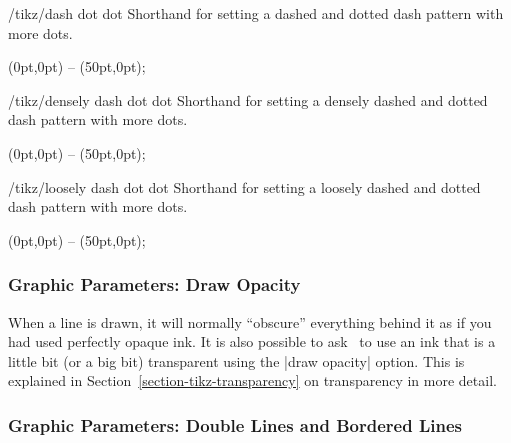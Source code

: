 \begin{stylekey}{/tikz/dash dot dot}
    Shorthand for setting a dashed and dotted dash pattern with more dots.
\begin{codeexample}[]
\tikz {} (0pt,0pt) -- (50pt,0pt);
\end{codeexample}
\end{stylekey}

\begin{stylekey}{/tikz/densely dash dot dot}
    Shorthand for setting a densely dashed and dotted dash pattern with more dots.
\begin{codeexample}[]
\tikz {} (0pt,0pt) -- (50pt,0pt);
\end{codeexample}
\end{stylekey}

\begin{stylekey}{/tikz/loosely dash dot dot}
    Shorthand for setting a loosely dashed and dotted dash pattern with more dots.
\begin{codeexample}[]
\tikz {} (0pt,0pt) -- (50pt,0pt);
\end{codeexample}
\end{stylekey}


\subsubsection{Graphic Parameters: Draw Opacity}

When a line is drawn, it will normally ``obscure'' everything behind it as if
you had used perfectly opaque ink. It is also possible to ask \tikzname\ to use
an ink that is a little bit (or a big bit) transparent using the |draw opacity|
option. This is explained in Section~\ref{section-tikz-transparency} on
transparency in more detail.


\subsubsection{Graphic Parameters: Double Lines and Bordered Lines}

